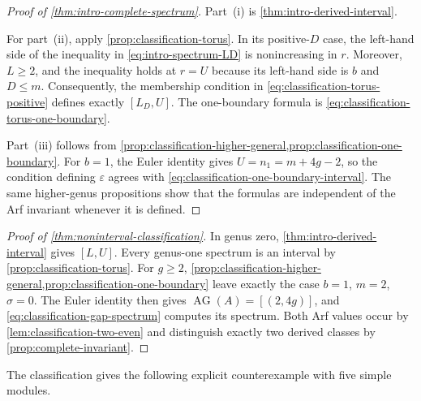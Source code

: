 \documentclass[11pt]{amsart}
\theoremstyle{definition}
\theoremstyle{plain}
\theoremstyle{definition}
\theoremstyle{definition}
\newcommand{\AG}{\operatorname{AG}}
\begin{document}
\begin{proof}[Proof of \cref{thm:intro-complete-spectrum}]
Part~\textup{(i)} is \cref{thm:intro-derived-interval}.

For part~\textup{(ii)}, apply \cref{prop:classification-torus}.
In its positive-$D$ case, the left-hand side of the inequality in
\eqref{eq:intro-spectrum-LD} is nonincreasing in $r$.
Moreover, $L\geq2$, and the inequality holds at $r=U$ because its
left-hand side is $b$ and $D\leq m$.
Consequently, the membership condition in
\eqref{eq:classification-torus-positive} defines exactly $[L_D,U]$.
The one-boundary formula is
\eqref{eq:classification-torus-one-boundary}.

Part~\textup{(iii)} follows from
\cref{prop:classification-higher-general,prop:classification-one-boundary}.
For $b=1$, the Euler identity gives $U=n_1=m+4g-2$, so the condition
defining $\varepsilon$ agrees with
\eqref{eq:classification-one-boundary-interval}.
The same higher-genus propositions show that the formulas are independent
of the Arf invariant whenever it is defined.
\end{proof}

\begin{proof}[Proof of \cref{thm:noninterval-classification}]
In genus zero, \cref{thm:intro-derived-interval} gives $[L,U]$.
Every genus-one spectrum is an interval by
\cref{prop:classification-torus}.  For $g\geq2$,
\cref{prop:classification-higher-general,prop:classification-one-boundary}
leave exactly the case $b=1$, $m=2$, $\sigma=0$.
The Euler identity then gives $\AG(A)=[(2,4g)]$, and
\eqref{eq:classification-gap-spectrum} computes its spectrum.
Both Arf values occur by \cref{lem:classification-two-even} and
distinguish exactly two derived classes by
\cref{prop:complete-invariant}.
\end{proof}

The classification gives the following explicit counterexample
with five simple modules.
\end{document}
